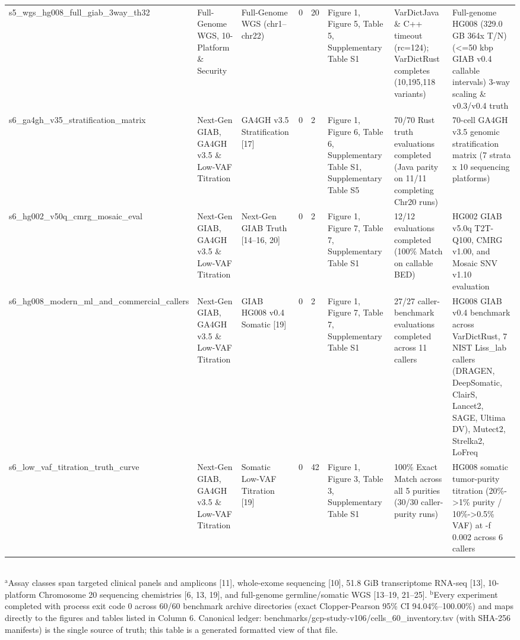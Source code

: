 \begin{table}[htbp]
{\begin{tabular}{llllllll}
s5\_wgs\_hg008\_full\_giab\_3way\_th32 & Full-Genome WGS, 10-Platform \& Security & Full-Genome WGS (chr1--chr22) & 0 & 20 & Figure 1, Figure 5, Table 5, Supplementary Table S1 & VarDictJava \& C++ timeout (rc=124); VarDictRust completes (10,195,118 variants) & Full-genome HG008 (329.0 GB 364x T/N) (\textless{}=50 kbp GIAB v0.4 callable intervals) 3-way scaling \& v0.3/v0.4 truth \\
s6\_ga4gh\_v35\_stratification\_matrix & Next-Gen GIAB, GA4GH v3.5 \& Low-VAF Titration & GA4GH v3.5 Stratification [17] & 0 & 2 & Figure 1, Figure 6, Table 6, Supplementary Table S1, Supplementary Table S5 & 70/70 Rust truth evaluations completed (Java parity on 11/11 completing Chr20 runs) & 70-cell GA4GH v3.5 genomic stratification matrix (7 strata x 10 sequencing platforms) \\
s6\_hg002\_v50q\_cmrg\_mosaic\_eval & Next-Gen GIAB, GA4GH v3.5 \& Low-VAF Titration & Next-Gen GIAB Truth [14--16, 20] & 0 & 2 & Figure 1, Figure 7, Table 7, Supplementary Table S1 & 12/12 evaluations completed (100\% Match on callable BED) & HG002 GIAB v5.0q T2T-Q100, CMRG v1.00, and Mosaic SNV v1.10 evaluation \\
s6\_hg008\_modern\_ml\_and\_commercial\_callers & Next-Gen GIAB, GA4GH v3.5 \& Low-VAF Titration & GIAB HG008 v0.4 Somatic [19] & 0 & 2 & Figure 1, Figure 7, Table 7, Supplementary Table S1 & 27/27 caller-benchmark evaluations completed across 11 callers & HG008 GIAB v0.4 benchmark across VarDictRust, 7 NIST Liss\_lab callers (DRAGEN, DeepSomatic, ClairS, Lancet2, SAGE, Ultima DV), Mutect2, Strelka2, LoFreq \\
s6\_low\_vaf\_titration\_truth\_curve & Next-Gen GIAB, GA4GH v3.5 \& Low-VAF Titration & Somatic Low-VAF Titration [19] & 0 & 42 & Figure 1, Figure 3, Table 3, Supplementary Table S1 & 100\% Exact Match across all 5 purities (30/30 caller-purity runs) & HG008 somatic tumor-purity titration (20\%-\textgreater{}1\% purity / 10\%-\textgreater{}0.5\% VAF) at -f 0.002 across 6 callers \\
\hline
\end{tabular}%
}
\\[4pt]\footnotesize{$^{\text{a}}$Assay classes span targeted clinical panels and amplicons [11], whole-exome sequencing [10], 51.8 GiB transcriptome RNA-seq [13], 10-platform Chromosome 20 sequencing chemistries [6, 13, 19], and full-genome germline/somatic WGS [13--19, 21--25]. $^{\text{b}}$Every experiment completed with process exit code 0 across 60/60 benchmark archive directories (exact Clopper-Pearson 95\% CI 94.04\%--100.00\%) and maps directly to the figures and tables listed in Column 6. Canonical ledger: benchmarks/gcp-study-v106/cells\_60\_inventory.tsv (with SHA-256 manifests) is the single source of truth; this table is a generated formatted view of that file.}
\end{table}

